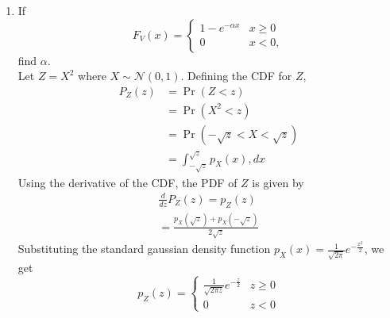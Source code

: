 \documentclass[12pt]{book}
\providecommand{\pr}[1]{\ensuremath{\Pr\left(#1\right)}}
\providecommand{\gauss}[2]{\mathcal{N}\ensuremath{\left(#1,#2\right)}}
\begin{document}
\begin{enumerate}
\item
If
\begin{equation}
F_{V}(x) = 
\begin{cases}
1 - e^{-\alpha x} & x \geq 0 \\
0 & x < 0,
\end{cases}
\label{eq:chisq2_cdf_gen}
\end{equation}
%
find $\alpha$.\\

Let $Z=X^2$ where $X \sim \gauss{0}{1}$. Defining the CDF for $Z$,
\begin{align*}
P_Z(z) &= \pr{Z < z}\\
&= \pr{X^2 < z}\\
&= \pr{-\sqrt{z} < X < \sqrt{z}}\\
&= \int_{-\sqrt{z}}^{\sqrt{z}} p_X(x) ,dx
\end{align*}
Using the derivative of the CDF, the PDF of $Z$ is given by
\begin{align}
\frac{d}{dz}P_Z(z) = p_Z(z)\\
= \frac{p_X(\sqrt{z})+p_X(-\sqrt{z})}{2\sqrt{z}}
\end{align}
Substituting the standard gaussian density function $p_X(x) = \frac{1}{\sqrt{2\pi}}e^{-\frac{x^2}{2}}$, we get
\begin{equation}
p_Z(z) =
\begin{cases}
\frac{1}{\sqrt{2\pi z}}e^{-\frac{z}{2}} & z \ge 0\\
0 & z < 0
\end{cases}
\end{equation}


\end{enumerate}
\end{document}
